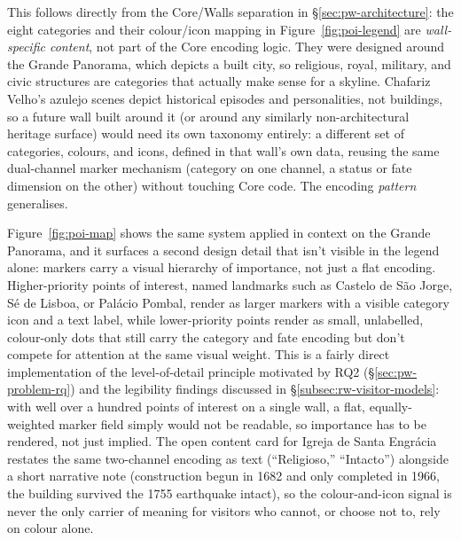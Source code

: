 This follows directly from the
Core/Walls separation in \S\ref{sec:pw-architecture}: the eight
categories and their colour/icon mapping in Figure~\ref{fig:poi-legend}
are \emph{wall-specific content}, not part of the Core encoding logic.
They were designed around the Grande Panorama, which depicts a built
city, so religious, royal, military, and civic structures are categories
that actually make sense for a skyline. Chafariz Velho's azulejo scenes
depict historical episodes and personalities, not
buildings, so a future wall built around it (or around any similarly
non-architectural heritage surface) would need its own taxonomy
entirely: a different set of categories, colours, and icons, defined in
that wall's own data, reusing the same dual-channel marker mechanism
(category on one channel, a status or fate dimension on the other)
without touching Core code. The encoding \emph{pattern} generalises. 

Figure~\ref{fig:poi-map} shows the same system applied in context on the
Grande Panorama, and it surfaces a second design detail that isn't
visible in the legend alone: markers carry a visual hierarchy of
importance, not just a flat encoding. Higher-priority points of interest,
named landmarks such as Castelo de S\~{a}o Jorge, S\'{e} de Lisboa, or
Pal\'{a}cio Pombal, render as larger markers with a visible category icon
and a text label, while lower-priority points render as small,
unlabelled, colour-only dots that still carry the category and fate
encoding but don't compete for attention at the same visual weight. This
is a fairly direct implementation of the level-of-detail principle
motivated by RQ2 (\S\ref{sec:pw-problem-rq}) and the legibility findings
discussed in \S\ref{subsec:rw-visitor-models}: with well over a hundred
points of interest on a single wall, a flat, equally-weighted marker
field simply would not be readable, so importance has to be rendered,
not just implied. The open content card for Igreja de Santa Engr\'{a}cia
restates the same two-channel encoding as text (``Religioso,''
``Intacto'') alongside a short narrative note (construction begun in
1682 and only completed in 1966, the building survived the 1755
earthquake intact), so the colour-and-icon signal is never the only
carrier of meaning for visitors who cannot, or choose not to, rely on
colour alone.

